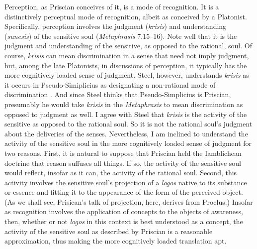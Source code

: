 \documentclass[12pt]{article}
\begin{document}
Perception, as Priscian conceives of it, is a mode of recognition. It is a distinctively perceptual mode of recognition, albeit as conceived by a Platonist. Specifically, perception involves the judgment (\emph{krisis}) and understanding (\emph{sunesis}) of the sensitive soul (\emph{Metaphrasis} 7.15--16). Note well that it is the judgment and understanding of the sensitive, as opposed to the rational, soul. Of course, \emph{krisis} can mean discrimination in a sense that need not imply judgment, but, among the late Platonists, in discussions of perception, it typically has the more cognitively loaded sense of judgment. Steel, however, understands \emph{krisis} as it occurs in Pseudo-Simiplicius as designating a non-rational mode of discrimination \citep[see Lautner's note in][222 n.131]{Sorabji:1997ly}. And since Steel thinks that Pseudo-Simplicius is Priscian, presumably he would take \emph{krisis} in the \emph{Metaphrasis} to mean discrimination as opposed to judgment as well. I agree with Steel that \emph{krisis} is the activity of the sensitive as opposed to the rational soul. So it is not the rational soul's judgment about the deliveries of the senses. Nevertheless, I am inclined to understand the activity of the sensitive soul in the more cognitively loaded sense of judgment for two reasons. First, it is natural to suppose that Priscian held the Iamblichean doctrine that reason suffuses all things. If so, the activity of the sensitive soul would reflect, insofar as it can, the activity of the rational soul. Second, this activity involves the sensitive soul's projection of a \emph{logos} native to its substance or essence and fitting it to the appearance of the form of the perceived object. (As we shall see, Prisican's talk of projection, here, derives from Proclus.) Insofar as recognition involves the application of concepts to the objects of awareness, then, whether or not \emph{logos} in this context is best understood as a concept, the activity of the sensitive soul as described by Priscian is a reasonable approximation, thus making the more cognitively loaded translation apt.
\end{document}
